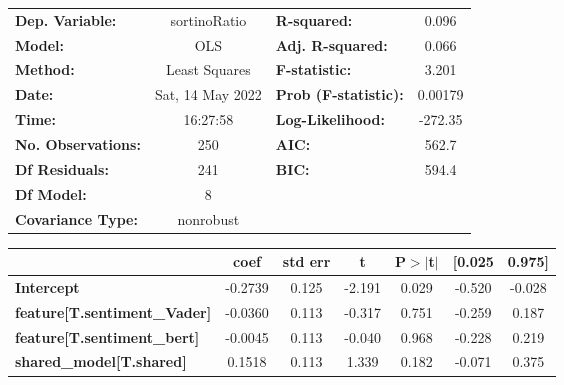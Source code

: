 \begin{center}
\begin{tabular}{lclc}
\toprule
\textbf{Dep. Variable:}                       &   sortinoRatio   & \textbf{  R-squared:         } &     0.096   \\
\textbf{Model:}                               &       OLS        & \textbf{  Adj. R-squared:    } &     0.066   \\
\textbf{Method:}                              &  Least Squares   & \textbf{  F-statistic:       } &     3.201   \\
\textbf{Date:}                                & Sat, 14 May 2022 & \textbf{  Prob (F-statistic):} &  0.00179    \\
\textbf{Time:}                                &     16:27:58     & \textbf{  Log-Likelihood:    } &   -272.35   \\
\textbf{No. Observations:}                    &         250      & \textbf{  AIC:               } &     562.7   \\
\textbf{Df Residuals:}                        &         241      & \textbf{  BIC:               } &     594.4   \\
\textbf{Df Model:}                            &           8      & \textbf{                     } &             \\
\textbf{Covariance Type:}                     &    nonrobust     & \textbf{                     } &             \\
\bottomrule
\end{tabular}
\begin{tabular}{lcccccc}
                                              & \textbf{coef} & \textbf{std err} & \textbf{t} & \textbf{P$> |$t$|$} & \textbf{[0.025} & \textbf{0.975]}  \\
\midrule
\textbf{Intercept}                            &      -0.2739  &        0.125     &    -2.191  &         0.029        &       -0.520    &       -0.028     \\
\textbf{feature[T.sentiment\_Vader]}          &      -0.0360  &        0.113     &    -0.317  &         0.751        &       -0.259    &        0.187     \\
\textbf{feature[T.sentiment\_bert]}           &      -0.0045  &        0.113     &    -0.040  &         0.968        &       -0.228    &        0.219     \\
\textbf{shared\_model[T.shared]}              &       0.1518  &        0.113     &     1.339  &         0.182        &       -0.071    &        0.375     \\

\end{tabular}
\end{center}
